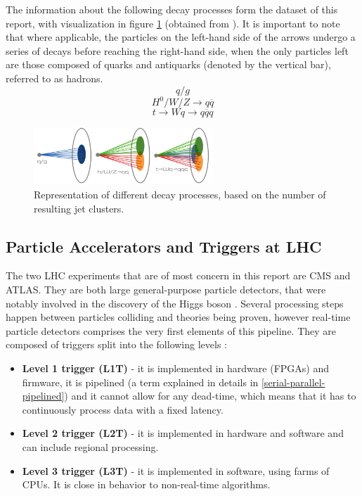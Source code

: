 The information about the following decay processes form the dataset of this report, with visualization in figure \ref{fig:jedi-jets} (obtained from \cite{9-newman2019jedi-net:}). It is important to note that where applicable, the particles on the left-hand side of the arrows undergo a series of decays before reaching the right-hand side, when the only particles left are those composed of quarks and antiquarks (denoted by the vertical bar), referred to as hadrons.
\[ q / g \]
\[ H^0 / W / Z \rightarrow q\overline{q} \]
\[ t \rightarrow Wq \rightarrow q\overline{q}q \]

\begin{figure}[hpt!]
  \centering
  \includegraphics[trim={0cm 0cm 0cm 0cm}, width=0.6\textwidth, center]{background/jedi_jets.png}
  \caption{Representation of different decay processes, based on the number of resulting jet clusters.}
  \label{fig:jedi-jets}
\end{figure}

\subsection{Particle Accelerators and Triggers at LHC}\label{triggers}
The two LHC experiments that are of most concern in this report are CMS and ATLAS. They are both large general-purpose particle detectors, that were notably involved in the discovery of the Higgs boson \cite{47-greeene2013higgs}. Several processing steps happen between particles colliding and theories being proven, however real-time particle detectors comprises the very first elements of this pipeline. They are composed of triggers split into the following levels \citep[p.16]{48-trigger}:

\begin{itemize}
  \item \textbf{Level 1 trigger (L1T)} - it is implemented in hardware (FPGAs) and firmware, it is pipelined (a term explained in details in \autoref{serial-parallel-pipelined}) and it cannot allow for any dead-time, which means that it has to continuously process data with a fixed latency.
  \item \textbf{Level 2 trigger (L2T)} - it is implemented in hardware and software and can include regional processing.
  \item \textbf{Level 3 trigger (L3T)} - it is implemented in software, using farms of CPUs. It is close in behavior to non-real-time algorithms.
\end{itemize}

